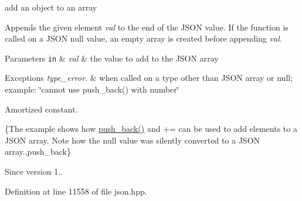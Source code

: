add an object to an array 

Appends the given element {\itshape val} to the end of the J\+S\+ON value. If the function is called on a J\+S\+ON null value, an empty array is created before appending {\itshape val}.


\begin{DoxyParams}[1]{Parameters}
\mbox{\tt in}  & {\em val} & the value to add to the J\+S\+ON array\\
\hline
\end{DoxyParams}

\begin{DoxyExceptions}{Exceptions}
{\em type\+\_\+error.} & when called on a type other than J\+S\+ON array or null; example\+: {\ttfamily \char`\"{}cannot use push\+\_\+back() with number\char`\"{}}\\
\hline
\end{DoxyExceptions}
Amortized constant.

\{The example shows how {\ttfamily \hyperlink{classnlohmann_1_1basic__json_ac8e523ddc8c2dd7e5d2daf0d49a9c0d7}{push\+\_\+back()}} and {\ttfamily +=} can be used to add elements to a J\+S\+ON array. Note how the {\ttfamily null} value was silently converted to a J\+S\+ON array.,push\+\_\+back\}

\begin{DoxySince}{Since}
version 1.. 
\end{DoxySince}


Definition at line 11558 of file json.\+hpp.

